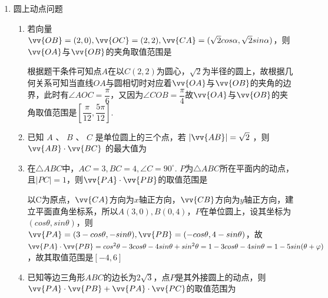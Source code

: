 \begin{enumerate}
\begin{enumerate}
\begin{jieda}
\begin{dingautolist}{172}
                \ps 此处根据三角形法则解三角形亦可.
            \end{dingautolist}
            $\langle\vv{a}, \vv{b}\rangle < \dfrac{\pi}{2}$的情况下已经找到$\left(\vv{a} \cdot  \vv{b}\right)_{max} = \left\{  \begin{array}{ll} m,&1 < m \leq \sqrt{6} - 1 \\  \dfrac{5 - {m}^{2}}{2},&\sqrt{6} - 1 <  m < 2 \end{array}\right.$，故无需考虑$\langle\vv{a}, \vv{b}\rangle\geq \dfrac{\pi}{2}$的情况.
        \end{jieda}
    \end{enumerate}

    \item 圆上动点问题
    \begin{enumerate}
        \item 若向量$\vv{OB} = (2, 0), \vv{OC} = (2, 2), \vv{CA} = (\sqrt{2}cos\alpha, \sqrt{2}sin\alpha)$，则$\vv{OA}$与$\vv{OB}$的夹角取值范围是
        \begin{jieda}
            根据题干条件可知点$A$在以$C(2,2)$为圆心，$\sqrt{2}$为半径的圆上，故根据几何关系可知当直线$OA$与圆相切时对应着$\vv{OA}$与$\vv{OB}$的夹角的边界，此时有$\angle AOC = \dfrac{\pi}{6}$，又因为$\angle COB = \dfrac{\pi}{4}$故$\vv{OA}$与$\vv{OB}$的夹角取值范围是$\left[\dfrac{\pi}{12}, \dfrac{5\pi}{12}\right]$.
        \end{jieda}
        \item 已知 $A$ 、 $B$ 、 $C$ 是单位圆上的三个点，若 $\left| \vv{AB}\right|  = \sqrt{2}$ ，则 $\vv{AB} \cdot \vv{BC}$ 的最大值为 
        \item 在$\triangle ABC$中，$AC = 3, BC = 4, \angle C = 90^{\circ}$. $P$为$\triangle ABC$所在平面内的动点，且$|PC| = 1$，则$\vv{PA} \cdot \vv{PB}$的取值范围是\blkda{$[-4, 6]$}
        \begin{jieda}
            以C为原点，$\vv{CA}$方向为$x$轴正方向，$\vv{CB}$方向为$y$轴正方向，建立平面直角坐标系，所以$A(3, 0), B(0, 4)$，$P$在单位圆上，设其坐标为$(cos\theta, sin\theta)$，则$\vv{PA} = (3-cos\theta, -sin\theta), \vv{PB} = (-cos\theta, 4-sin\theta)$，故$\vv{PA} \cdot \vv{PB} = cos^2\theta -3cos\theta - 4sin\theta + sin^2\theta = 1 -3cos\theta - 4sin\theta = 1 - 5sin(\theta + \varphi)$，故其取值范围是$[-4, 6]$
        \end{jieda}
        \item 已知等边三角形$ABC$的边长为$2\sqrt{3}$，点$P$是其外接圆上的动点，则$\vv{PA} \cdot \vv{PB} + \vv{PA} \cdot \vv{PC}$的取值范围为\blkda{$[0, 8]$}

\end{enumerate}
\end{enumerate}
